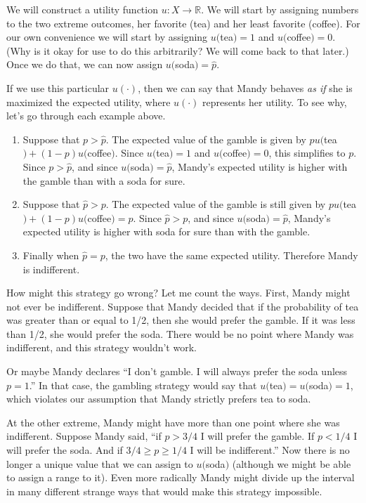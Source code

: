 We will construct a utility function  $u: X \to \mathbb{R}$. We will start by assigning numbers to the two extreme outcomes, her favorite (tea) and her least favorite (coffee).    For our own convenience we will start by assigning $u($tea$) = 1$ and $u($coffee$) = 0$. (Why is it okay for use to do this arbitrarily?  We will come back to that later.)  Once we do that, we can now assign $u($soda$) = \hat{p}$. 

If we use this particular $u(\cdot)$, then we can say that Mandy behaves {\it as if} she is maximized the expected utility, where $u(\cdot)$ represents her utility.  To see why, let's go through each example above.
\begin{enumerate}
\item Suppose that $p > \hat{p}$.  The expected value of the gamble is given by $p u($tea$) + (1-p) u($coffee$)$.  Since $u($tea$)=1$ and $u($coffee$)=0$, this simplifies to $p$.  Since $p > \hat{p}$, and since $u($soda$)=\hat{p}$, Mandy's expected utility is higher with the gamble than with a soda for sure.
\item Suppose that $\hat{p} > p$.  The expected value of the gamble is still given by $p u($tea$) + (1-p) u($coffee$) = p$. Since $\hat{p} > p$, and since $u($soda$)=\hat{p}$, Mandy's expected utility is higher with soda for sure than with the gamble.
\item Finally when $\hat{p} = p$, the two have the same expected utility.  Therefore Mandy is indifferent.
\end{enumerate}

How might this strategy go wrong?  Let me count the ways.  First, Mandy might not ever be indifferent.  Suppose that Mandy decided that if the probability of tea was greater than or equal to 1/2, then she would prefer the gamble.  If it was less than 1/2, she would prefer the soda.  There would be no point where Mandy was indifferent, and this strategy wouldn't work. 

Or maybe Mandy declares ``I don't gamble.  I will always prefer the soda unless $p=1$.''  In that case, the gambling strategy would say that $u($tea$) = u($soda$) = 1$, which violates our assumption that Mandy strictly prefers tea to soda.

At the other extreme, Mandy might have more than one point where she was indifferent.  Suppose Mandy said, ``if $p > 3/4$ I will prefer the gamble.  If $p < 1/4$ I will prefer the soda.  And if $3/4 \geq p \geq 1/4$ I will be indifferent.'' Now there is no longer a unique value that we can assign to $u($soda$)$ (although we might be able to assign a range to it).  Even more radically Mandy might divide up the interval in many different strange ways that would make this strategy impossible.

